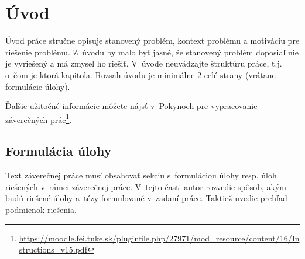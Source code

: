
{}

\chapter*{Úvod}

Úvod práce stručne opisuje stanovený problém, kontext problému a motiváciu pre riešenie problému. Z~úvodu by malo byť jasné, že stanovený problém doposiaľ nie je vyriešený a má zmysel ho riešiť.
V~úvode neuvádzajte štruktúru práce, t.j. o~čom je ktorá kapitola. Rozsah úvodu je minimálne 2 celé strany (vrátane formulácie úlohy).

Ďalšie užitočné informácie môžete nájsť v~Pokynoch pre vypracovanie záverečných prác\footnote{\url{https://moodle.fei.tuke.sk/pluginfile.php/27971/mod_resource/content/16/Instructions_v15.pdf}}.


\section*{Formulácia úlohy}

Text záverečnej práce musí obsahovať sekciu s~formuláciou úlohy resp. úloh riešených v~rámci záverečnej práce. V~tejto časti autor rozvedie spôsob, akým budú riešené úlohy a~tézy formulované v~zadaní práce. Taktiež uvedie prehľad podmienok riešenia.
